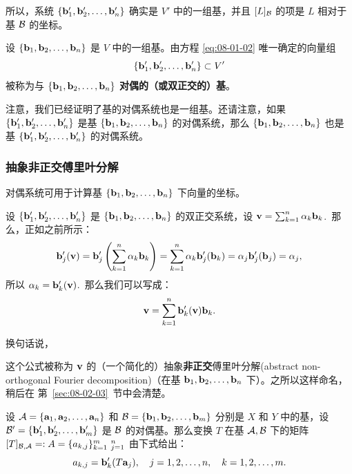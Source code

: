 所以，系统 $\{\mathbf{b}'_1, \mathbf{b}'_2, \dots, \mathbf{b}'_n\}$ 确实是 $V'$ 中的一组基，并且 $[L]_{\mathcal{B}}$ 的项是 $L$ 相对于基 $\mathcal{B}$ 的坐标。

\begin{definition}\label{stmt:08-01-04}
设 $\{\mathbf{b}_1, \mathbf{b}_2, \dots, \mathbf{b}_n\}$ 是 $V$ 中的一组基。由方程 \eqref{eq:08-01-02} 唯一确定的向量组
$$\{\mathbf{b}'_1, \mathbf{b}'_2, \dots, \mathbf{b}'_n\} \subset V'$$
被称为与 $\{\mathbf{b}_1, \mathbf{b}_2, \dots, \mathbf{b}_n\}$ \textbf{对偶的（或双正交的）基}。
\end{definition}

注意，我们已经证明了基的对偶系统也是一组基。还请注意，如果 $\{\mathbf{b}'_1, \mathbf{b}'_2, \dots, \mathbf{b}'_n\}$ 是基 $\{\mathbf{b}_1, \mathbf{b}_2, \dots, \mathbf{b}_n\}$ 的对偶系统，那么 $\{\mathbf{b}_1, \mathbf{b}_2, \dots, \mathbf{b}_n\}$ 也是基 $\{\mathbf{b}'_1, \mathbf{b}'_2, \dots, \mathbf{b}'_n\}$ 的对偶系统。

\subsubsection{抽象非正交傅里叶分解}\label{sec:08-01-03-01}

对偶系统可用于计算基 $\{\mathbf{b}_1, \mathbf{b}_2, \dots, \mathbf{b}_n\}$ 下向量的坐标。

设 $\{\mathbf{b}'_1, \mathbf{b}'_2, \dots, \mathbf{b}'_n\}$ 是 $\{\mathbf{b}_1, \mathbf{b}_2, \dots, \mathbf{b}_n\}$ 的双正交系统，设 $\mathbf{v} = \sum_{k=1}^n \alpha_k \mathbf{b}_k$.~那么，正如之前所示：
$$ \mathbf{b}'_j(\mathbf{v}) = \mathbf{b}'_j \left( \sum_{k=1}^n \alpha_k \mathbf{b}_k \right) = \sum_{k=1}^n \alpha_k \mathbf{b}'_j(\mathbf{b}_k) = \alpha_j \mathbf{b}'_j(\mathbf{b}_j) = \alpha_j, $$
所以 $\alpha_k = \mathbf{b}'_k(\mathbf{v})$.~那么我们可以写成：
\begin{equation}\label{eq:08-01-03}
\mathbf{v} = \sum_{k=1}^n \mathbf{b}'_k(\mathbf{v}) \mathbf{b}_k .
\end{equation}

换句话说，


{}

这个公式被称为 $\mathbf{v}$ 的（一个简化的）抽象\textbf{非正交}傅里叶分解(abstract non-orthogonal Fourier decomposition)（在基 $\mathbf{b}_1, \mathbf{b}_2, \dots, \mathbf{b}_n$ 下）。之所以这样命名，稍后在 第~\ref{sec:08-02-03}~节中会清楚。

\begin{remark}\label{stmt:08-01-05}
设 $\mathcal{A} = \{\mathbf{a}_1, \mathbf{a}_2, \dots, \mathbf{a}_n\}$ 和 $\mathcal{B} = \{\mathbf{b}_1, \mathbf{b}_2, \dots, \mathbf{b}_m\}$ 分别是 $X$ 和 $Y$ 中的基，设 $\mathcal{B}' = \{\mathbf{b}'_1, \mathbf{b}'_2, \dots, \mathbf{b}'_m\}$ 是 $\mathcal{B}$ 的对偶基。那么变换 $T$ 在基 $\mathcal{A}, \mathcal{B}$ 下的矩阵 $[T]_{\mathcal{B},\mathcal{A}} =: A = \{a_{k,j}\}_{k=1}^{m} ~_{ j=1}^{n}$ 由下式给出：
$$ a_{k,j} = \mathbf{b}'_k(T \mathbf{a}_j), \quad j = 1, 2, \dots, n, \quad k = 1, 2, \dots, m. $$
\end{remark}


